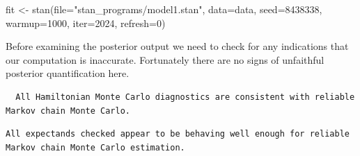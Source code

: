 \documentclass[
  letterpaper,
  DIV=11,
  numbers=noendperiod]{scrartcl}
\newenvironment{Shaded}{\begin{snugshade}}{\end{snugshade}}
\newcommand{\AttributeTok}[1]{\textcolor[rgb]{0.40,0.45,0.13}{#1}}
\newcommand{\DecValTok}[1]{\textcolor[rgb]{0.68,0.00,0.00}{#1}}
\newcommand{\FunctionTok}[1]{\textcolor[rgb]{0.28,0.35,0.67}{#1}}
\newcommand{\NormalTok}[1]{\textcolor[rgb]{0.00,0.23,0.31}{#1}}
\newcommand{\OtherTok}[1]{\textcolor[rgb]{0.00,0.23,0.31}{#1}}
\newcommand{\SpecialCharTok}[1]{\textcolor[rgb]{0.37,0.37,0.37}{#1}}
\newcommand{\StringTok}[1]{\textcolor[rgb]{0.13,0.47,0.30}{#1}}
\begin{document}
\begin{Shaded}
\begin{Highlighting}[]
\NormalTok{fit }\OtherTok{\textless{}{-}} \FunctionTok{stan}\NormalTok{(}\AttributeTok{file=}\StringTok{"stan\_programs/model1.stan"}\NormalTok{,}
            \AttributeTok{data=}\NormalTok{data, }\AttributeTok{seed=}\DecValTok{8438338}\NormalTok{,}
            \AttributeTok{warmup=}\DecValTok{1000}\NormalTok{, }\AttributeTok{iter=}\DecValTok{2024}\NormalTok{, }\AttributeTok{refresh=}\DecValTok{0}\NormalTok{)}
\end{Highlighting}
\end{Shaded}

Before examining the posterior output we need to check for any
indications that our computation is inaccurate. Fortunately there are no
signs of unfaithful posterior quantification here.

\begin{Shaded}
\end{Shaded}

\begin{verbatim}
  All Hamiltonian Monte Carlo diagnostics are consistent with reliable
Markov chain Monte Carlo.
\end{verbatim}

\begin{Shaded}
\end{Shaded}

\begin{verbatim}
All expectands checked appear to be behaving well enough for reliable
Markov chain Monte Carlo estimation.
\end{verbatim}
\end{document}
